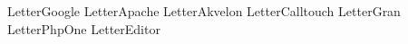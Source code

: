 \renewcommand\ExhibitGroup{Letters}

{LetterGoogle}
{LetterApache}
{LetterAkvelon}
{LetterCalltouch}
{LetterGran}
{LetterPhpOne}
{LetterEditor}
